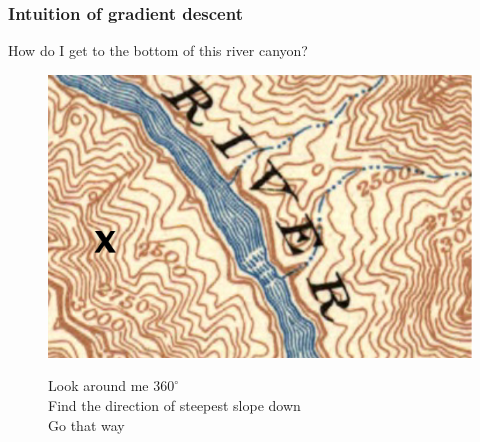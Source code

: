 \documentclass[13.5pt,aspecratio=169]{beamer}
\begin{document}
\begin{frame}
\onehalfspacing
	\frametitle{Intuition of gradient descent}
	
	\begin{block}{} %
		How do I get to the bottom of this river canyon?
	\end{block}
        \bigskip
        \begin{figure}[h]
            \begin{minipage}{0.5\textwidth} %
                \centering
                \includegraphics[scale=0.4]{river_canyon.png} %
            \end{minipage}
            \hfill
            \begin{minipage}{0.45\textwidth} %
                Look around me $360^\circ$ \\
                Find the direction of steepest slope down \\
                Go that way 
            \end{minipage}
        \end{figure}
\end{frame}
\end{document}
